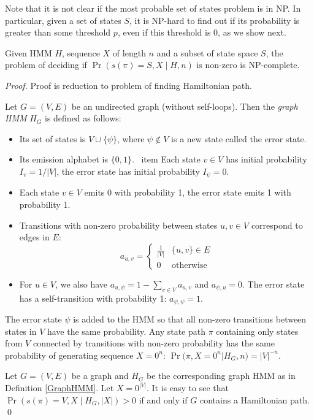 
Note that it is not clear if the most probable set of states problem is in
NP. In particular, given a set of states $S$, it is NP-hard to find out if its
probability is greater than some threshold $p$, even if this threshold
is 0, as we show next.

\begin{theorem}
Given HMM $H$, sequence $X$ of length $n$ 
and a subset of state space $S$, the problem of deciding if
$\Pr\left(s(\pi)=S, X\mid H, n\right)$ is non-zero is NP-complete.
\end{theorem}

\begin{proof} Proof is reduction to problem of finding Hamiltonian path.

\begin{definition}\label{GraphHMM}
Let $G=(V,E)$ be an undirected graph (without self-loops). 
Then the \emph{graph HMM} $H_G$ is defined as follows:
\begin{itemize}
\item Its set of states is $V\cup \{\psi\}$, where $\psi\notin V$ is a
   new state called the error state.
\item Its emission alphabet is $\{0,1\}$.
\ item Each state $v\in V$ has initial probability $I_{v} = 1/|V|$, the
error state has initial probability $I_{\psi}=0$.
\item Each state $v\in V$ emits 0 with probability 1, the error state emits 1 
with probability 1.
\item Transitions with non-zero probability between states $u,v\in V$
  correspond to edges in $E$:
$$a_{u,v}=\begin{cases}
\frac1{|V|} & \{u,v\}\in E\\
0 & \text{otherwise}
\end{cases}$$
\item For $u\in V$, we also have $a_{u,\psi}=1-\sum_{v\in V}a_{u,v}$
and $a_{\psi,u}=0$. The error state has a self-transition with 
probability 1: $a_{\psi,\psi}=1$.
\end{itemize}
\end{definition}

The error state $\psi$ is added to the HMM so that all non-zero
transitions between states in $V$ have the same probability. Any state
path $\pi$ containing only states from $V$ connected by transitions
with non-zero probability has the same probability of generating
sequence $X=0^n$: $\Pr(\pi, X=0^n|H_G,n) = |V|^{-n}$.

Let $G=(V,E)$ be a graph  
and $H_G$ be the corresponding graph HMM as
in Definition \ref{GraphHMM}. Let $X=0^{|V|}$.  
It is easy to see that $\Pr\left(s(\pi)=V,X \mid H_G, |X|
\right)>0$ if and only if $G$ contains a Hamiltonian path. \qed
\end{proof}

